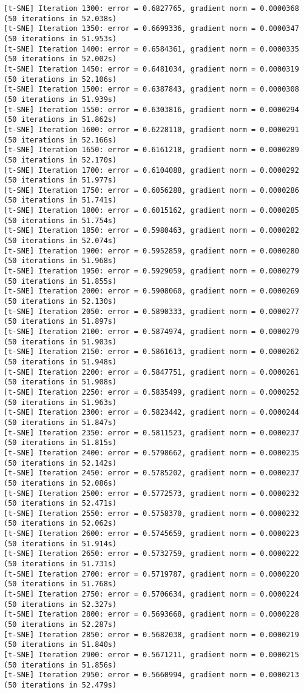 \documentclass[11pt]{article}
\begin{document}
\begin{Verbatim}[commandchars=\\\{\}]
[t-SNE] Iteration 1300: error = 0.6827765, gradient norm = 0.0000368 (50 iterations in 52.038s)
[t-SNE] Iteration 1350: error = 0.6699336, gradient norm = 0.0000347 (50 iterations in 51.953s)
[t-SNE] Iteration 1400: error = 0.6584361, gradient norm = 0.0000335 (50 iterations in 52.002s)
[t-SNE] Iteration 1450: error = 0.6481034, gradient norm = 0.0000319 (50 iterations in 52.106s)
[t-SNE] Iteration 1500: error = 0.6387843, gradient norm = 0.0000308 (50 iterations in 51.939s)
[t-SNE] Iteration 1550: error = 0.6303816, gradient norm = 0.0000294 (50 iterations in 51.862s)
[t-SNE] Iteration 1600: error = 0.6228110, gradient norm = 0.0000291 (50 iterations in 52.166s)
[t-SNE] Iteration 1650: error = 0.6161218, gradient norm = 0.0000289 (50 iterations in 52.170s)
[t-SNE] Iteration 1700: error = 0.6104088, gradient norm = 0.0000292 (50 iterations in 51.977s)
[t-SNE] Iteration 1750: error = 0.6056288, gradient norm = 0.0000286 (50 iterations in 51.741s)
[t-SNE] Iteration 1800: error = 0.6015162, gradient norm = 0.0000285 (50 iterations in 51.754s)
[t-SNE] Iteration 1850: error = 0.5980463, gradient norm = 0.0000282 (50 iterations in 52.074s)
[t-SNE] Iteration 1900: error = 0.5952859, gradient norm = 0.0000280 (50 iterations in 51.968s)
[t-SNE] Iteration 1950: error = 0.5929059, gradient norm = 0.0000279 (50 iterations in 51.855s)
[t-SNE] Iteration 2000: error = 0.5908060, gradient norm = 0.0000269 (50 iterations in 52.130s)
[t-SNE] Iteration 2050: error = 0.5890333, gradient norm = 0.0000277 (50 iterations in 51.897s)
[t-SNE] Iteration 2100: error = 0.5874974, gradient norm = 0.0000279 (50 iterations in 51.903s)
[t-SNE] Iteration 2150: error = 0.5861613, gradient norm = 0.0000262 (50 iterations in 51.948s)
[t-SNE] Iteration 2200: error = 0.5847751, gradient norm = 0.0000261 (50 iterations in 51.908s)
[t-SNE] Iteration 2250: error = 0.5835499, gradient norm = 0.0000252 (50 iterations in 51.963s)
[t-SNE] Iteration 2300: error = 0.5823442, gradient norm = 0.0000244 (50 iterations in 51.847s)
[t-SNE] Iteration 2350: error = 0.5811523, gradient norm = 0.0000237 (50 iterations in 51.815s)
[t-SNE] Iteration 2400: error = 0.5798662, gradient norm = 0.0000235 (50 iterations in 52.142s)
[t-SNE] Iteration 2450: error = 0.5785202, gradient norm = 0.0000237 (50 iterations in 52.086s)
[t-SNE] Iteration 2500: error = 0.5772573, gradient norm = 0.0000232 (50 iterations in 52.471s)
[t-SNE] Iteration 2550: error = 0.5758370, gradient norm = 0.0000232 (50 iterations in 52.062s)
[t-SNE] Iteration 2600: error = 0.5745659, gradient norm = 0.0000223 (50 iterations in 51.914s)
[t-SNE] Iteration 2650: error = 0.5732759, gradient norm = 0.0000222 (50 iterations in 51.731s)
[t-SNE] Iteration 2700: error = 0.5719787, gradient norm = 0.0000220 (50 iterations in 51.768s)
[t-SNE] Iteration 2750: error = 0.5706634, gradient norm = 0.0000224 (50 iterations in 52.327s)
[t-SNE] Iteration 2800: error = 0.5693668, gradient norm = 0.0000228 (50 iterations in 52.287s)
[t-SNE] Iteration 2850: error = 0.5682038, gradient norm = 0.0000219 (50 iterations in 51.840s)
[t-SNE] Iteration 2900: error = 0.5671211, gradient norm = 0.0000215 (50 iterations in 51.856s)
[t-SNE] Iteration 2950: error = 0.5660994, gradient norm = 0.0000213 (50 iterations in 52.479s)


\end{Verbatim}
\end{document}
